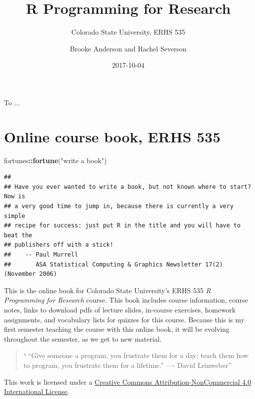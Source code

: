 \documentclass[]{book}
\title{R Programming for Research}
\subtitle{Colorado State University, ERHS 535}
\author{Brooke Anderson and Rachel Severson}
\date{2017-10-04}
\makeatletter
\newenvironment{Shaded}{\begin{snugshade}}{\end{snugshade}}
\newcommand{\KeywordTok}[1]{\textcolor[rgb]{0.13,0.29,0.53}{\textbf{#1}}}
\newcommand{\StringTok}[1]{\textcolor[rgb]{0.31,0.60,0.02}{#1}}
\newcommand{\OperatorTok}[1]{\textcolor[rgb]{0.81,0.36,0.00}{\textbf{#1}}}
\newcommand{\NormalTok}[1]{#1}
\newenvironment{kframe}{%
\medskip{}
\setlength{\fboxsep}{.8em}
 \def\at@end@of@kframe{}%
 \ifinner\ifhmode%
  \def\at@end@of@kframe{\end{minipage}}%
  \begin{minipage}{\columnwidth}%
 \fi\fi%
 \def\FrameCommand##1{\hskip\@totalleftmargin \hskip-\fboxsep
 \colorbox{shadecolor}{##1}\hskip-\fboxsep
     \hskip-\linewidth \hskip-\@totalleftmargin \hskip\columnwidth}%
 \MakeFramed {\advance\hsize-\width
   \@totalleftmargin\z@ \linewidth\hsize
   \@setminipage}}%
 {\par\unskip\endMakeFramed%
 \at@end@of@kframe}
\renewenvironment{Shaded}{\begin{kframe}}{\end{kframe}}
\theoremstyle{definition}
\theoremstyle{definition}
\theoremstyle{definition}
\theoremstyle{remark}
\makeatother
\begin{document}
\maketitle

\cleardoublepage\newpage\thispagestyle{empty}\null
\cleardoublepage\newpage\thispagestyle{empty}
\begin{center}
To ...
\end{center}

\frontmatter

{
\setcounter{tocdepth}{1}
\tableofcontents
}
\chapter*{Online course book, ERHS
535}\label{online-course-book-erhs-535}

\begin{Shaded}
\begin{Highlighting}[]
\NormalTok{fortunes}\OperatorTok{::}\KeywordTok{fortune}\NormalTok{(}\StringTok{"write a book"}\NormalTok{)}
\end{Highlighting}
\end{Shaded}

\begin{verbatim}
## 
## Have you ever wanted to write a book, but not known where to start? Now is
## a very good time to jump in, because there is currently a very simple
## recipe for success: just put R in the title and you will have to beat the
## publishers off with a stick!
##    -- Paul Murrell
##       ASA Statistical Computing & Graphics Newsletter 17(2) (November 2006)
\end{verbatim}

This is the online book for Colorado State University's ERHS 535 \emph{R
Programming for Research} course. This book includes course information,
course notes, links to download pdfs of lecture slides, in-course
exercises, homework assignments, and vocabulary lists for quizzes for
this course. Because this is my first semester teaching the course with
this online book, it will be evolving throughout the semester, as we get
to new material.

\begin{quote}
``\,``Give someone a program, you frustrate them for a day; teach them
how to program, you frustrate them for a lifetime.'' ---- David
Leinweber''
\end{quote}

This work is licensed under a
\href{https://creativecommons.org/licenses/by-nc/4.0/}{Creative Commons
Attribution-NonCommercial 4.0 International License}.
\end{document}
